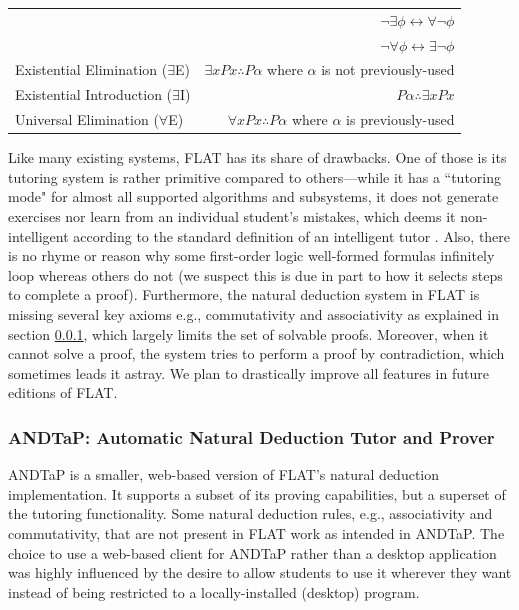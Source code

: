 \documentclass[ms]{uncgdissertationexp2}
\theoremstyle{plain}
\theoremstyle{definition}
\theoremstyle{remark}
\begin{document}
\begin{table}[!ht]
\begin{tabular}{lr}
							&$\lnot\exists\phi \leftrightarrow \forall\lnot\phi$\\
							&$\lnot\forall\phi \leftrightarrow \exists\lnot\phi$\\
		Existential Elimination ($\exists$E)&$\exists{x}Px \therefore P\alpha$ where $\alpha$ is not previously-used\\
		Existential Introduction ($\exists$I)&$P\alpha \therefore \exists{x}Px$\\
		Universal Elimination ($\forall$E)&$\forall{x}Px \therefore P\alpha$ where $\alpha$ is previously-used\\
	\bottomrule
  \end{tabular}
\end{table}

Like many existing systems, FLAT has its share of drawbacks. One of those is its tutoring system is rather primitive compared to others---while it has a ``tutoring mode" for almost all supported algorithms and subsystems, it does not generate exercises nor learn from an individual student's mistakes, which deems it non-intelligent according to the standard definition of an intelligent tutor \cite{woolf}. Also, there is no rhyme or reason why some first-order logic well-formed formulas infinitely loop whereas others do not (we suspect this is due in part to how it selects steps to complete a proof). Furthermore, the natural deduction system in FLAT is missing several key axioms e.g., commutativity and associativity as explained in section \ref{section:andtap}, which largely limits the set of solvable proofs. Moreover, when it cannot solve a proof, the system tries to perform a proof by contradiction, which sometimes leads it astray. We plan to drastically improve all features in future editions of FLAT.

\subsubsection{ANDTaP: Automatic Natural Deduction Tutor and Prover}\label{section:andtap}
ANDTaP is a smaller, web-based version of FLAT's natural deduction implementation. It supports a subset of its proving capabilities, but a superset of the tutoring functionality. Some natural deduction rules, e.g., associativity and commutativity, that are not present in FLAT work as intended in ANDTaP. The choice to use a web-based client for ANDTaP rather than a desktop application was highly influenced by the desire to allow students to use it wherever they want instead of being restricted to a locally-installed (desktop) program.
\end{document}
